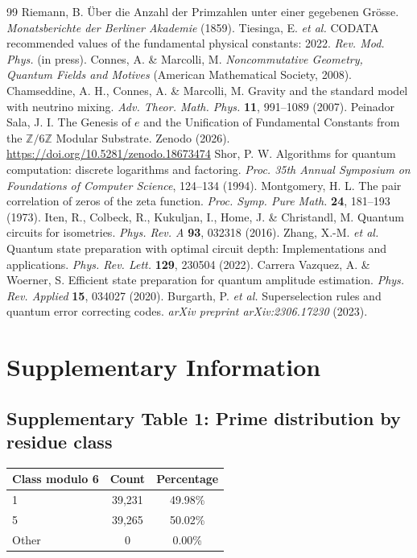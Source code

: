 \documentclass[pdflatex,sn-nature]{sn-jnl}
\theoremstyle{thmstyleone}
\theoremstyle{thmstyletwo}
\theoremstyle{thmstylethree}
\begin{document}

\begin{thebibliography}{99}
 Riemann, B. \"Uber die Anzahl der Primzahlen unter einer gegebenen Gr\"osse. \textit{Monatsberichte der Berliner Akademie} (1859).
 Tiesinga, E. \textit{et al.} CODATA recommended values of the fundamental physical constants: 2022. \textit{Rev. Mod. Phys.} (in press).
 Connes, A. \& Marcolli, M. \textit{Noncommutative Geometry, Quantum Fields and Motives} (American Mathematical Society, 2008).
 Chamseddine, A. H., Connes, A. \& Marcolli, M. Gravity and the standard model with neutrino mixing. \textit{Adv. Theor. Math. Phys.} \textbf{11}, 991--1089 (2007).
 Peinador Sala, J. I. The Genesis of $e$ and the Unification of Fundamental Constants from the $\mathbb{Z}/6\mathbb{Z}$ Modular Substrate. Zenodo (2026). \url{https://doi.org/10.5281/zenodo.18673474}
 Shor, P. W. Algorithms for quantum computation: discrete logarithms and factoring. \textit{Proc. 35th Annual Symposium on Foundations of Computer Science}, 124--134 (1994).
 Montgomery, H. L. The pair correlation of zeros of the zeta function. \textit{Proc. Symp. Pure Math.} \textbf{24}, 181--193 (1973).
 Iten, R., Colbeck, R., Kukuljan, I., Home, J. \& Christandl, M. Quantum circuits for isometries. \textit{Phys. Rev. A} \textbf{93}, 032318 (2016).
 Zhang, X.-M. \textit{et al.} Quantum state preparation with optimal circuit depth: Implementations and applications. \textit{Phys. Rev. Lett.} \textbf{129}, 230504 (2022).
 Carrera Vazquez, A. \& Woerner, S. Efficient state preparation for quantum amplitude estimation. \textit{Phys. Rev. Applied} \textbf{15}, 034027 (2020).
 Burgarth, P. \textit{et al.} Superselection rules and quantum error correcting codes. \textit{arXiv preprint arXiv:2306.17230} (2023).
\end{thebibliography}

\appendix
\section*{Supplementary Information}

\subsection*{Supplementary Table 1: Prime distribution by residue class}
\begin{tabular}{lcc}
\toprule
\textbf{Class modulo 6} & \textbf{Count} & \textbf{Percentage} \\
\midrule
1 & 39,231 & 49.98\% \\
5 & 39,265 & 50.02\% \\
Other & 0 & 0.00\% \\
\bottomrule
\end{tabular}
\end{document}
